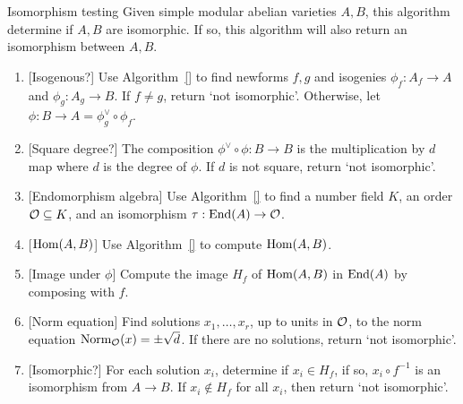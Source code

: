 \begin{algorithm}{Isomorphism testing}%
    \label{alg:isomorphism_testing}
    Given simple modular abelian varieties $A, B$, this algorithm determine if
    $A, B$ are isomorphic. If so, this algorithm will also return an
    isomorphism between $A, B$.
    \begin{enumerate}
        \item{}
            [Isogenous?] Use Algorithm~\ref{} to find newforms $f,g$ and
            isogenies $\phi_f:A_f\to A$ and $\phi_g:A_g\to B$. If $f\neq g$,
            return `not isomorphic'. Otherwise, let $\phi:B\to A=\phi_g ^\vee
            \circ \phi_f$.
        \item{}
            [Square degree?] The composition $\phi^\vee \circ \phi:B\to B$ is
            the multiplication by $d$ map where $d$ is the degree of $\phi$. If
            $d$ is not square, return `not isomorphic'.
        \item{}
            [Endomorphism algebra] Use Algorithm~\ref{} to find a number field
            $K$, an order $\mathcal{O}\subseteq K$, and an isomorphism $\tau:\operatorname{End}(A)\to
            \mathcal{O}$.
        \item{}
            [$\operatorname{Hom}(A, B)$] Use Algorithm~\ref{} to compute $\operatorname{Hom}(A,B)$.
        \item{}
            [Image under $\phi$] Compute the image $H_f$ of $\operatorname{Hom}(A, B)$ in
            $\operatorname{End}(A)$ by composing with $f$.
        \item{}
            [Norm equation] Find solutions $x_1,\ldots,x_r$, up to units in
            $\mathcal{O}$, to the norm equation $\operatorname{Norm}_{\mathcal{O}} (x) = \pm \sqrt{d}$. If
            there are no solutions, return `not isomorphic'.
        \item{}
            [Isomorphic?] For each solution $x_i$, determine if $x_i\in H_f$,
            if so, $x_i \circ f^{-1}$ is an isomorphism from $A\to B$. If
            $x_i\notin H_f$ for all $x_i$, then return `not isomorphic'.
    \end{enumerate}
\end{algorithm}
